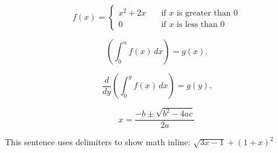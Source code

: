 \documentclass{article}
\begin{document}
    \[ f(x) =  
        \begin{cases}  
            x^2 + 2x       & \quad \text{if } x \text{ is greater than 0}\\ %
            0  & \quad \text{if } x \text{ is less than 0} %
        \end{cases}  
    \]  

    \[  
         \left( \int_{0}^{n} f(x)\,dx\right)=g(x).  
    \]  

    \[  
      \frac{d}{dy}\left( \int_{0}^{y} f(x)\,dx\right)=g(y).  
    \]  


    \begin{equation} 
    x= \frac{-b \pm \sqrt{b^2 -4ac}}{2a}
    \end{equation}

    This sentence uses  delimiters to show math inline:  $\sqrt{3x-1}+(1+x)^2$

    
\end{document}
